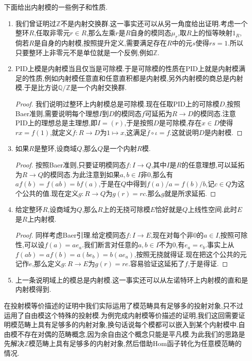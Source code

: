 下面给出内射模的一些例子和性质.
\begin{enumerate}
	\item 我们曾证明过$\mathbb{Z}$不是内射交换群.这一事实还可以从另一角度给出证明.考虑一个整环$R$,任取非零元$r\in R$,那么左乘$r$是$R$自身的模同态$\mu_r$,取$R$上的恒等映射$1_R$,倘若$R$是自身的内射模,按照提升定义,需要满足存在$R$中的元$s$使得$rs=1$.所以只要整环上非零元不是单位就是一个反例,例如$\mathbb{Z}$.
	\item PID上模是内射模当且仅当是可除模.于是可除模的性质在PID上就是内射模满足的性质,例如内射模任意直和任意直积都是内射模,另外内射模的商总是内射模.于是比方说$\mathbb{Q}/\mathbb{Z}$是一个内射交换群.
	\begin{proof}
		
		我们说明过整环上内射模总是可除模.现在任取PID上的可除模$D$,按照Baer准则,需要说明每个理想$I$到$D$的模同态$f$可延拓为$R\to D$的模同态.注意PID上的理想总是主理想,即$I=(r)$,于是按照$D$是可除模,存在$x\in D$使得$rx=f(1)$,就定义$\overline{f}:R\to D$为$1\mapsto x$,这满足$\overline{f}\circ\iota=f$.这就说明$D$是内射模.
	\end{proof}
	\item 如果$R$是整环,设商域$Q$,那么$Q$是一个内射$R$模.
	\begin{proof}
		
		按照Baer准则,只要证明模同态$f:I\to Q$,其中$I$是$R$的任意理想,可以延拓为$R\to Q$的模同态.为此注意到如果$a,b\in I$非0,那么有$af(b)=f(ab)=bf(a)$,于是在$Q$中得到$f(a)/a=f(b)/b$,记$c\in Q$为这个公共的值.现在定义$g:R\to Q$为$g(r)=rc$.那么$g$就是所求延拓.
	\end{proof}
	\item 给定整环$R$,设商域为$Q$,那么$R$上的无挠可除模$E$恰好就是$Q$上线性空间.此时$E$是$R$上内射模.
	\begin{proof}
		
		同样考虑Baer引理.给定模同态$f:I\to E$,现在对每个非0的$a\in I$,按照可除性,可以设$f(a)=ae_a$.我们断言对任意的$a,b\in I$不为0,有$e_a=e_b$.事实上从$f(ab)=af(b)=a(be_b)=b(ae_a)$,按照无挠就得证.现在把这个公共的元记作$e$,那么定义$g:R\to E$为$g(r)=re$.容易验证这延拓了$f$,于是得证.
	\end{proof}
    \item 上一条说明域上的模总是内射模.这一事实还可以从左诺特环上内射模的直和是内射模得到.
\end{enumerate}

在投射模等价描述的证明中我们实际运用了模范畴具有足够多的投射对象,只不过运用了自由模这个特殊的投射模.为例完成内射模等价描述的证明,我们这回需要证明模范畴上具有足够多的内射对象,换句话说每个模都可以嵌入到某个内射模中.自由模不存在对偶的范畴概念,因为余自由这个概念只能是平凡模.为此我们的思路是先解决$\mathbb{Z}$模范畴上具有足够多的内射对象,然后借助Hom函子转化为任意模范畴的情况.

